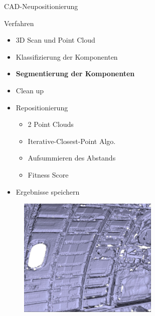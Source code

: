 \begin{frame}{CAD-Neupositionierung}
    \begin{minipage}[m]{0.49\textwidth}
    \begin{block}{Verfahren}
        \begin{itemize}
            \item 3D Scan und Point Cloud
            \item Klassifizierung der Komponenten
            \item \textbf{Segmentierung der Komponenten}
            \item Clean up
            \item Repositionierung
            \begin{itemize}
                \item 2 Point Clouds
                \item Iterative-Closest-Point Algo.
                \item Aufsummieren des Abstands
                \item Fitness Score
            \end{itemize}
            \item Ergebnisse speichern
        \end{itemize}
    \end{block}
    \end{minipage}
    \begin{minipage}[m]{0.49\textwidth}
      \begin{figure}
          \includegraphics[width=190pt]{img_niklas/aircraft_3dscan.PNG}
          \label{fig:my_label}
      \end{figure}
    \end{minipage}
\end{frame}

